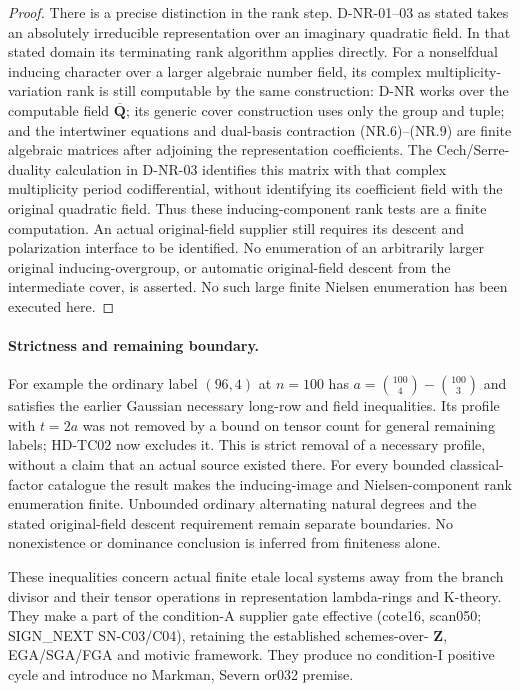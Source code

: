 \begin{proof}
There is a precise distinction in the rank step. D-NR-01--03
as stated takes an absolutely irreducible representation over
an imaginary quadratic field. In that stated domain its
terminating rank algorithm applies directly. For a nonselfdual
inducing character over a larger algebraic number field, its
complex multiplicity-variation rank is still computable by
the same construction: D-NR works over the computable field
$\overline{\mathbf Q}$; its generic cover construction uses
only the group and tuple; and the intertwiner equations and
dual-basis contraction (NR.6)--(NR.9) are finite algebraic
matrices after adjoining the representation coefficients.
The Cech/Serre-duality calculation in D-NR-03 identifies this
matrix with that complex multiplicity period codifferential,
without identifying its coefficient field with the original
quadratic field. Thus these inducing-component rank tests
are a finite computation. An actual original-field supplier
still requires its descent and polarization interface to be
identified. No enumeration of an arbitrarily larger original
inducing-overgroup, or automatic original-field descent from
the intermediate cover, is asserted. No such large finite
Nielsen enumeration has been executed here.
\end{proof}

\paragraph{Strictness and remaining boundary.}
For example the ordinary label $(96,4)$ at $n=100$ has
$a=\binom{100}{4}-\binom{100}{3}$ and satisfies the earlier
Gaussian necessary long-row and field inequalities.
Its profile with $t=2a$ was not removed by a bound on tensor
count for general remaining labels; HD-TC02 now excludes it.
This is strict removal of a necessary profile, without a
claim that an actual source existed there.
For every bounded classical-factor catalogue the result
makes the inducing-image and Nielsen-component rank enumeration
finite. Unbounded ordinary alternating natural degrees and
the stated original-field descent requirement remain separate
boundaries. No nonexistence or dominance conclusion is inferred
from finiteness alone.

These inequalities concern actual finite etale local systems
away from the branch divisor and their tensor operations in
representation lambda-rings and K-theory. They make a part of
the condition-A supplier gate effective (cote16, scan050;
SIGN\_NEXT SN-C03/C04), retaining the established schemes-over-
$\mathbf Z$, EGA/SGA/FGA and motivic framework. They produce
no condition-I positive cycle and introduce no Markman,
Severn or032 premise.
